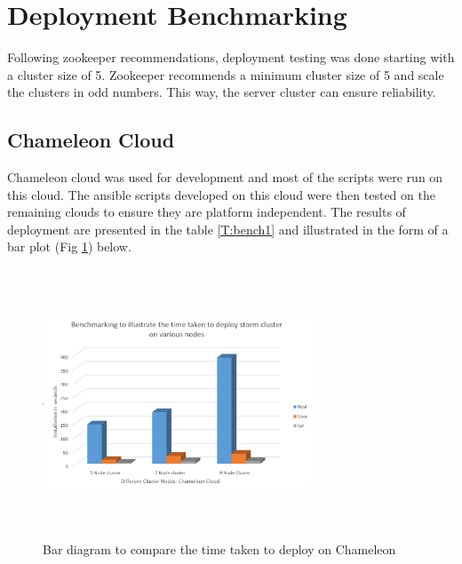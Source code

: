\documentclass[9pt,twocolumn,twoside]{../../styles/osajnl}
\begin{document}
\section{Deployment Benchmarking}
Following zookeeper recommendations, deployment testing was done
starting with a cluster size of 5. Zookeeper recommends a minimum
cluster size of 5 and scale the clusters in odd numbers. This way, the
server cluster can ensure reliability.

\subsection{Chameleon Cloud}
Chameleon cloud was used for development and most of the scripts were
run on this cloud. The ansible scripts developed on this cloud were
then tested on the remaining clouds to ensure they are platform
independent. The results of deployment are presented in the table
\ref{T:bench1} and illustrated in the form of a bar plot (Fig
\ref{barc}) below.

\begin{table}[htb]
\centering
\caption{Table illustrating the various times it took to deploy on Chameleon cloud}\label{T:bench1}
\end{table}

\begin{figure}[!htb]
  \includegraphics[width=8cm,height=8cm,keepaspectratio,width=\linewidth]{images/bar-1.png}
  \caption{Bar diagram to compare the time taken to deploy on Chameleon}
  \label{barc}
\end{figure}
\end{document}

